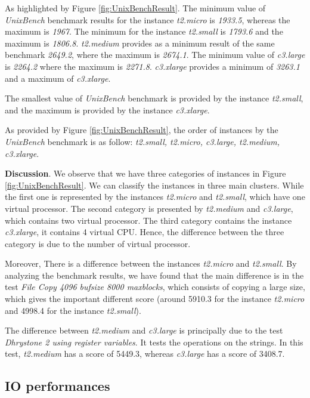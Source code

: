 \documentclass[10pt, conference]{IEEEtran}
\begin{document}
As highlighted by Figure \ref{fig:UnixBenchResult}. The minimum value of \textit{UnixBench} benchmark results for the instance \textit{t2.micro} is \textit{1933.5}, whereas the maximum is \textit{1967}. The minimum for the instance \textit{t2.small} is \textit{1793.6} and the maximum is \textit{1806.8}. \textit{t2.medium} provides as a minimum result of the same benchmark \textit{2649.2}, where the maximum is \textit{2674.1}. The minimum value of \textit{c3.large} is \textit{2264.2} where the maximum is \textit{2271.8}. \textit{c3.xlarge} provides a minimum of \textit{3263.1} and a maximum of \textit{c3.xlarge}.

The smallest value of \textit{UnixBench} benchmark is provided by the instance \textit{t2.small}, and the maximum is provided by the instance \textit{c3.xlarge}.

As provided by Figure \ref{fig:UnixBenchResult}, the order of instances by the \textit{UnixBench} benchmark is as follow: \textit{t2.small, t2.micro, c3.large, t2.medium, c3.xlarge}.

\textbf{Discussion}. We observe that we have three categories of instances in Figure \ref{fig:UnixBenchResult}. We can classify the instances in three main clusters. While the first one is represented by the instances \textit{t2.micro} and \textit{t2.small}, which have one virtual processor. The second category is presented by \textit{t2.medium} and \textit{c3.large}, which contains two virtual processor. The third category contains the instance \textit{c3.xlarge}, it contains 4 virtual CPU. Hence, the difference between the three category is due to the number of virtual processor.

Moreover, There is a difference between the instances \textit{t2.micro} and \textit{t2.small}. By analyzing the benchmark results, we have found that the main difference is in the test \textit{File Copy 4096 bufsize 8000 maxblocks}, which consists of copying a large size, which gives the important different score (around 5910.3 for the instance \textit{t2.micro} and 4998.4 for the instance \textit{t2.small}). 

The difference between \textit{t2.medium} and \textit{c3.large} is principally due to the test \textit{Dhrystone 2 using register variables}. It tests the operations on the strings. In this test, \textit{t2.medium} has a score of 5449.3, whereas \textit{c3.large} has a score of 3408.7.

\subsection{IO performances}
\end{document}
